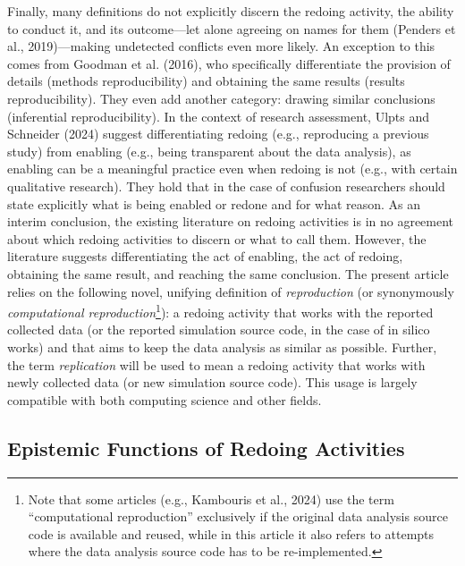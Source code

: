 \documentclass[authordate, meta]{jote-new-article}
\begin{document}
	Finally, many definitions do not explicitly discern the redoing activity, the ability to conduct it, and its outcome—let alone agreeing on names for them (Penders et al., 2019)—making undetected conflicts even more likely. An exception to this comes from Goodman et al. (2016), who specifically differentiate the provision of details (methods reproducibility) and obtaining the same results (results reproducibility). They even add another category: drawing similar conclusions (inferential reproducibility). In the context of research assessment, Ulpts and Schneider (2024) suggest differentiating redoing (e.g., reproducing a previous study) from enabling (e.g., being transparent about the data analysis), as enabling can be a meaningful practice even when redoing is not (e.g., with certain qualitative research). They hold that in the case of confusion researchers should state explicitly what is being enabled or redone and for what reason. As an interim conclusion, the existing literature on redoing activities is in no agreement about which redoing activities to discern or what to call them. However, the literature suggests differentiating the act of enabling, the act of redoing, obtaining the same result, and reaching the same conclusion. The present article relies on the following novel, unifying definition of \emph{reproduction} (or synonymously \emph{computational reproduction}\footnote{ Note that some articles (e.g., Kambouris et al., 2024) use the term “computational reproduction” exclusively if the original data analysis source code is available and reused, while in this article it also refers to attempts where the data analysis source code has to be re-implemented.}): a redoing activity that works with the reported collected data (or the reported simulation source code, in the case of in silico works) and that aims to keep the data analysis as similar as possible. Further, the term \emph{replication} will be used to mean a redoing activity that works with newly collected data (or new simulation source code). This usage is largely compatible with both computing science and other fields.



	\subsection{Epistemic Functions of Redoing Activities}
\end{document}

